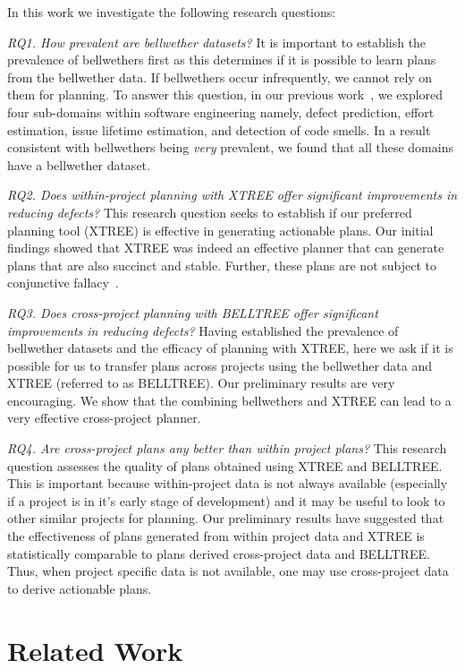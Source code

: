 \documentclass[conference]{IEEEtran}
\begin{document}
In this work we investigate the following research questions:

\noindent\textit{RQ1. How prevalent are bellwether datasets?}
It is important to establish the prevalence of bellwethers first as this determines if it is possible to learn plans from the bellwether data. If bellwethers occur infrequently, we cannot rely on them for planning. To answer this question, in our previous work~\cite{krishna17b}, we explored four sub-domains within software engineering namely, defect prediction, effort estimation, issue lifetime estimation, and detection of code smells. In a result consistent with bellwethers being \textit{very} prevalent, we found that all these domains have a bellwether dataset.


\noindent\textit{RQ2. Does within-project planning with XTREE offer significant improvements in reducing defects?}
This research question seeks to establish if our preferred planning tool (XTREE) is effective in generating actionable plans. Our initial findings showed that XTREE was indeed an effective planner that can generate plans that are also succinct and stable. Further, these plans are not subject to conjunctive fallacy~\cite{krishna17a}.

\noindent\textit{RQ3. Does  cross-project  planning  with  BELLTREE offer significant improvements in reducing defects?}
Having established the prevalence of bellwether datasets and the efficacy of planning with XTREE, here we ask if it is possible for us to transfer plans across projects using the bellwether data and XTREE (referred to as BELLTREE). Our preliminary results are very encouraging. We show that the combining bellwethers and XTREE can lead to a very effective cross-project planner.


\noindent\textit{RQ4. Are cross-project  plans  any  better  than within project plans?}
This research question assesses the quality of plans obtained using XTREE and BELLTREE. This is important because within-project data is not always available (especially if a project is in it's early stage of development) and it may be useful to look to other similar projects for planning. Our preliminary results have suggested that the effectiveness of plans generated from within project data and XTREE is statistically comparable to plans derived cross-project data and BELLTREE. Thus, when project specific data is not available, one may use cross-project data to derive actionable plans.

\section{Related Work}
\end{document}
